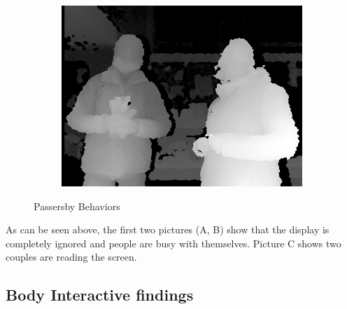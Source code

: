 \begin{figure}[H]
\begin{subfigure}[H]{0.32\textwidth}
        \centering
        \includegraphics[width=\textwidth]{Figures/8/non_inter_findings/effects/reading}
        \caption{}
        \label{fig:non-reading}
    \end{subfigure}
    \caption{Passersby Behaviors}
    \label{fig:three-non-behavior}
\end{figure}

As can be seen above, the first two pictures (A, B) show that the display is completely ignored and people are busy with themselves. Picture C shows two couples are reading the screen.



\subsection{Body Interactive findings}

